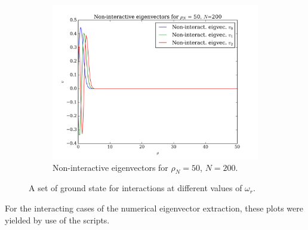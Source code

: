 \documentclass[11pt,a4paper,notitlepage]{article}
\begin{document}
\begin{figure}[H]
\begin{subfigure}[b]{0.45\textwidth}
    \end{subfigure}
\begin{subfigure}[t]{0.45\textwidth}
        \includegraphics[scale=0.40]{../non_interacting_eigvec_plot_rhoN=50_N=200.png}
        \caption{Non-interactive eigenvectors for $\rho_N = 50$, $N = 200$.}\label{fig:eigvecs-non-interact-50-200}
\end{subfigure}
    \caption{A set of ground state for interactions at different values of $\omega_r$.}\label{fig:eigvecs-non-interact}
\end{figure}
For the interacting cases of the numerical eigenvector extraction, these plots were yielded by use of the scripts.
\end{document}
